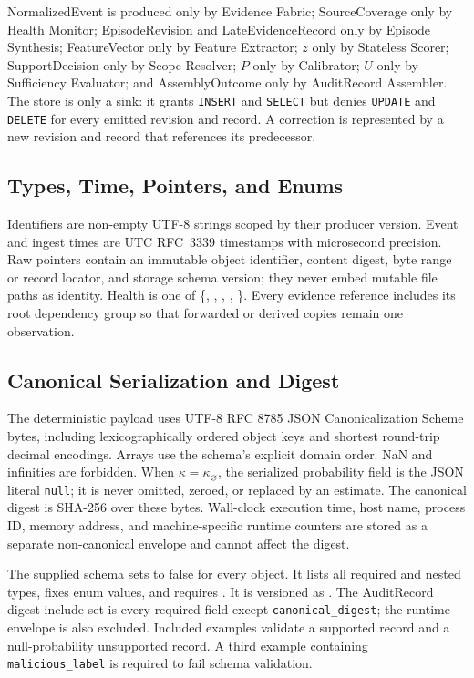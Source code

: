 NormalizedEvent is produced only by Evidence Fabric; SourceCoverage only by Health Monitor;
EpisodeRevision and LateEvidenceRecord only by Episode Synthesis; FeatureVector only by Feature
Extractor; $z$ only by Stateless Scorer; SupportDecision only by Scope Resolver; $P$ only by
Calibrator; $U$ only by Sufficiency Evaluator; and AssemblyOutcome only by AuditRecord Assembler.
The store is only a sink:
it grants \texttt{INSERT} and \texttt{SELECT} but denies \texttt{UPDATE} and \texttt{DELETE} for every
emitted revision and record. A correction is represented by a new revision and record that
references its predecessor.

\subsection{Types, Time, Pointers, and Enums}

Identifiers are non-empty UTF-8 strings scoped by their producer version. Event and ingest
times are UTC RFC~3339 timestamps with microsecond precision. Raw pointers contain an
immutable object identifier, content digest, byte range or record locator, and storage schema
version; they never embed mutable file paths as identity. Health is one of
\{, , , ,
\}. Every evidence reference includes its root dependency group so
that forwarded or derived copies remain one observation.

\subsection{Canonical Serialization and Digest}
\label{app:canonical-serialization}

The deterministic payload uses UTF-8 RFC 8785 JSON Canonicalization Scheme bytes, including
lexicographically ordered object keys and shortest round-trip decimal encodings. Arrays use
the schema's explicit domain order. NaN and infinities are forbidden. When
$\kappa=\kappa_\varnothing$, the
serialized probability field is the JSON literal \texttt{null}; it is never omitted, zeroed,
or replaced by an estimate. The canonical digest is SHA-256 over these bytes. Wall-clock
execution time, host name, process ID, memory address, and machine-specific runtime counters
are stored as a separate non-canonical envelope and cannot affect the digest.

The supplied schema sets  to false for every object. It lists all
required and nested types, fixes enum values, and requires . It is
versioned as
. The AuditRecord digest include set is every required field except
\texttt{canonical\_digest}; the runtime envelope is also excluded. Included examples validate a
supported record and a null-probability unsupported record. A third example containing
\texttt{malicious\_label} is required to fail schema validation.

